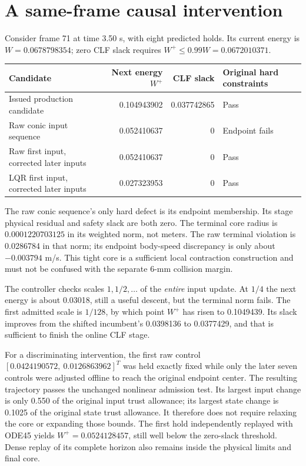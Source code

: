 \documentclass[11pt]{article}
\begin{document}
\section{A same-frame causal intervention}
Consider frame 71 at time 3.50 s, with eight predicted holds. Its current
energy is $W=0.0678798354$; zero CLF slack requires
$W^+\le0.99W=0.0672010371$.
\begin{center}
\begin{tabular}{lrrl}
\toprule
Candidate&Next energy $W^+$&CLF slack&Original hard constraints\\
\midrule
Issued production candidate&0.104943902&0.037742865&Pass\\
Raw conic input sequence&0.052410637&0&Endpoint fails\\
Raw first input, corrected later inputs&0.052410637&0&Pass\\
LQR first input, corrected later inputs&0.027323953&0&Pass\\
\bottomrule
\end{tabular}
\end{center}
The raw conic sequence's only hard defect is its endpoint membership. Its
stage physical residual and safety slack are both zero. The terminal core
radius is $0.0001220703125$ in its weighted norm, not meters. The raw terminal
violation is 0.0286784 in that norm; its endpoint body-speed discrepancy is
only about $-0.003794$ m/s. This tight core is a sufficient local contraction
construction and must not be confused with the separate 6-mm collision
margin.

The controller checks scales $1,1/2,\ldots$ of the \emph{entire} input update.
At $1/4$ the next energy is about 0.03018, still a useful descent, but the
terminal norm fails. The first admitted scale is $1/128$, by which point
$W^+$ has risen to 0.1049439. Its slack improves from the shifted incumbent's
0.0398136 to 0.0377429, and that is sufficient to finish the online CLF stage.

For a discriminating intervention, the first raw control
$[0.0424190572,\ 0.0126863962]^T$ was held exactly fixed while only the later
seven controls were adjusted offline to reach the original endpoint center.
The resulting trajectory passes the unchanged nonlinear admission test.
Its largest input change is only 0.550 of the original input trust allowance;
its largest state change is 0.1025 of the original state trust allowance.
It therefore does not require relaxing the core or expanding those bounds.
The first hold independently replayed with ODE45 yields $W^+=0.0524128457$,
still well below the zero-slack threshold. Dense replay of its complete
horizon also remains inside the physical limits and final core.
\end{document}
